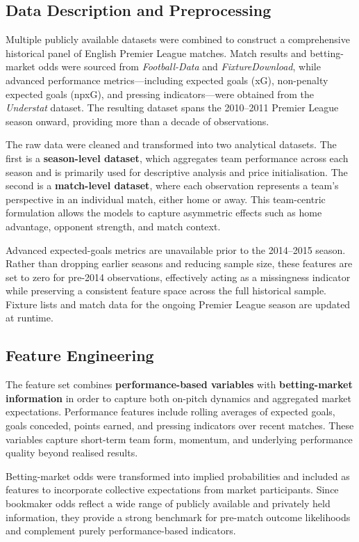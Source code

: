 \documentclass[11pt,a4paper]{article}
\begin{document}
\subsection{Data Description and Preprocessing}

Multiple publicly available datasets were combined to construct a comprehensive historical panel of English Premier League matches. Match results and betting-market odds were sourced from \textit{Football-Data} and \textit{FixtureDownload}, while advanced performance metrics—including expected goals (xG), non-penalty expected goals (npxG), and pressing indicators—were obtained from the \textit{Understat} dataset. The resulting dataset spans the 2010–2011 Premier League season onward, providing more than a decade of observations.

The raw data were cleaned and transformed into two analytical datasets. The first is a \textbf{season-level dataset}, which aggregates team performance across each season and is primarily used for descriptive analysis and price initialisation. The second is a \textbf{match-level dataset}, where each observation represents a team’s perspective in an individual match, either home or away. This team-centric formulation allows the models to capture asymmetric effects such as home advantage, opponent strength, and match context.

Advanced expected-goals metrics are unavailable prior to the 2014–2015 season. Rather than dropping earlier seasons and reducing sample size, these features are set to zero for pre-2014 observations, effectively acting as a missingness indicator while preserving a consistent feature space across the full historical sample. Fixture lists and match data for the ongoing Premier League season are updated at runtime.

\subsection{Feature Engineering}

The feature set combines \textbf{performance-based variables} with \textbf{betting-market information} in order to capture both on-pitch dynamics and aggregated market expectations. Performance features include rolling averages of expected goals, goals conceded, points earned, and pressing indicators over recent matches. These variables capture short-term team form, momentum, and underlying performance quality beyond realised results.

Betting-market odds were transformed into implied probabilities and included as features to incorporate collective expectations from market participants. Since bookmaker odds reflect a wide range of publicly available and privately held information, they provide a strong benchmark for pre-match outcome likelihoods and complement purely performance-based indicators.
\end{document}
